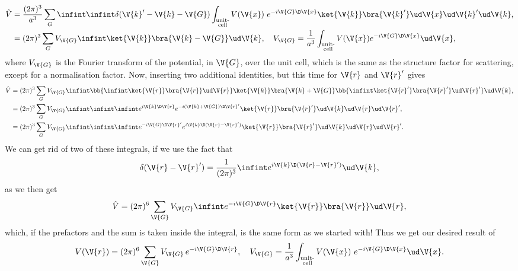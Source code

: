 \documentclass[main.tex]{subfiles}
\begin{document}
	\begin{align}
		\hat{V} &= \frac{(2\pi)^3}{a^3} \sum_{G} \infint \infint \delta(\V{k}'-\V{k}-\V{G}) \int_{\substack{\text{unit-} \\\text{cell}}} V(\V{x})\  e^{-i \V{G} \D \V{x}} \ket{\V{k}} \bra{\V{k}'} \ud \V{x} \ud\V{k}'   \ud\V{k}, \\
		&= (2\pi)^3 \sum_{G} V_{\V{G}}  \infint \ket{\V{k}} \bra{\V{k}-\V{G}} \ud \V{k}, \quad V_{\V{G}} = \frac{1}{a^3} \int_{\substack{\text{unit-} \\\text{cell}}} V(\V{x}) e^{-i\V{G} \D \V{x}} \ud \V{x},
	\end{align}
	where $ V_{\V{G}} $ is the Fourier transform of the potential, in $ \V{G} $, over the unit cell, which is the same as the structure factor for scattering, except for a normalisation factor. Now, inserting two additional identities, but this time for $ \V{r} $ and $ \V{r}' $ gives
	\begin{align}
		\hat{V} &= (2\pi)^3\sum_{G}  V_{\V{G}} \infint \bb{\infint \ket{\V{r}} \bra{\V{r}} \ud \V{r}} \ket{\V{k}} \bra{\V{k}+ \V{G}} \bb{\infint \ket{\V{r}'} \bra{\V{r}'} \ud \V{r}'} \ud \V{k}, \\
		&= (2\pi)^3 \sum_{G} V_{\V{G}} \infint  \infint \infint e^{i \V{k} \D \V{r}} e^{-i (\V{k}+\V{G}) \D \V{r}'} \ket{\V{r}} \bra{\V{r}'} \ud \V{k} \ud \V{r} \ud \V{r}', \\
		&= (2\pi)^3 \sum_{G} V_{\V{G}} \infint \infint \infint  e^{-i \V{G} \D \V{r}'} e^{i \V{k} \D (\V{r}-\V{r}')} \ket{\V{r}} \bra{\V{r}'} \ud \V{k} \ud \V{r} \ud \V{r}'.
	\end{align}
	We can get rid of two of these integrals, if we use the fact that \cite{riley}
	\begin{equation} \label{eq:delta_funct}
		\delta(\V{r}-\V{r}') = \frac{1}{(2\pi)^3} \infint  e^{i \V{k} \D (\V{r}-\V{r}')} \ud \V{k},
	\end{equation}
	as we then get
	\begin{equation}
		\hat{V} = (2\pi)^6 \sum_{\V{G}} V_{\V{G}} \infint e^{-i \V{G} \D \V{r}} \ket{\V{r}} \bra{\V{r}} \ud \V{r},
	\end{equation}
	which, if the prefactors and the sum is taken inside the integral, is the same form as we started with! Thus we get our desired result of
	\begin{equation}
		V(\V{r}) =  (2\pi)^6 \sum_{\V{G}} V_{\V{G}} \,e^{-i \V{G} \D \V{r}}, \quad V_{\V{G}} = \frac{1}{a^3} \int_{\substack{\text{unit-} \\\text{cell}}}  V(\V{x})\  e^{-i \V{G} \D \V{x}} \ud \V{x}.
	\end{equation}
\end{document}
